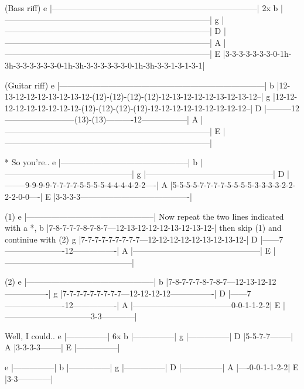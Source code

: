 \begin{lsttab}
(Bass riff)
e |---------------------------------------------------------------------------| 2x
b |---------------------------------------------------------------------------|
g |---------------------------------------------------------------------------|
D |---------------------------------------------------------------------------|
A |---------------------------------------------------------------------------|
E |3-3-3-3-3-3-3-0-1h-3h-3-3-3-3-3-3-0-1h-3h-3-3-3-3-3-3-0-1h-3h-3-3-1-3-1-3-1| 

(Guitar riff)
e |---------------------------------------------------------------------------|
b |12-13-12-12-12-13-12-13-12-(12)-(12)-(12)-(12)-12-13-12-12-12-13-12-13-12--|
g |12-12-12-12-12-12-12-12-12-(12)-(12)-(12)-(12)-12-12-12-12-12-12-12-12-12--|
D |---------12--------------------------(13)-(13)----------12-----------------|
A |---------------------------------------------------------------------------|
E |---------------------------------------------------------------------------|

* So you're..
e |-----------------------------------------------|
b |-----------------------------------------------|
g |-----------------------------------------------|
D |--------9-9-9-9-7-7-7-7-5-5-5-5-4-4-4-4-2-2----|
A |5-5-5-5-7-7-7-7-5-5-5-5-3-3-3-3-2-2-2-2-0-0----|
E |3-3-3-3----------------------------------------|

(1)
e |-----------------------------------------------| Now repeat the two lines indicated with a *, 
b |7-8-7-7-7-8-7-8-7---12-13-12-12-12-13-12-13-12-| then skip (1) and continiue with (2)
g |7-7-7-7-7-7-7-7-7---12-12-12-12-12-13-12-13-12-|
D |------7----------------------12----------------|
A |-----------------------------------------------|
E |-----------------------------------------------|

(2)
e |-----------------------------------------------|
b |7-8-7-7-7-8-7-8-7---12-13-12-12----------------|
g |7-7-7-7-7-7-7-7-7---12-12-12-12----------------|
D |------7----------------------12----------------|
A |------------------------------------0-0-1-1-2-2|
E |--------------------------------3-3------------|

Well, I could..
e |---------------| 6x
b |---------------|
g |---------------|
D |5-5-7-7--------|
A |3-3-3-3--------| 
E |---------------|

e |---------------|
b |---------------|
g |---------------|
D |---------------|
A |----0-0-1-1-2-2|
E |3-3------------|
\end{lsttab}
\newpage

